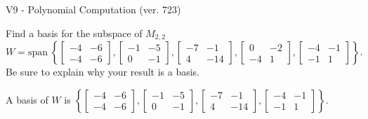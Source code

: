 \begin{exercise}
  \begin{exerciseTitle}V9 - Polynomial Computation (ver. 723)\end{exerciseTitle}
  \begin{exerciseStatement}
    Find a basis for the subspace of \(M_{2,2}\) 
\[W=\mathrm{span}\ \left\{\left[\begin{array}{cc}
-4 & -6 \\
-4 & -6
\end{array}\right] , \left[\begin{array}{cc}
-1 & -5 \\
0 & -1
\end{array}\right] , \left[\begin{array}{cc}
-7 & -1 \\
4 & -14
\end{array}\right] , \left[\begin{array}{cc}
0 & -2 \\
-4 & 1
\end{array}\right] , \left[\begin{array}{cc}
-4 & -1 \\
-1 & 1
\end{array}\right]\right\}.\]
 Be sure to explain why your result is a basis.


  \end{exerciseStatement}
  \begin{exerciseAnswer}
   A basis of \(W\) is  \(\left\{\left[\begin{array}{cc}
-4 & -6 \\
-4 & -6
\end{array}\right] , \left[\begin{array}{cc}
-1 & -5 \\
0 & -1
\end{array}\right] , \left[\begin{array}{cc}
-7 & -1 \\
4 & -14
\end{array}\right] , \left[\begin{array}{cc}
-4 & -1 \\
-1 & 1
\end{array}\right]\right\}\).
  


  \end{exerciseAnswer}
\end{exercise}